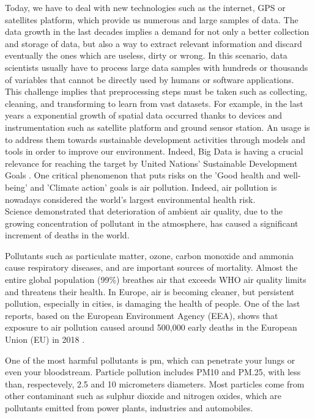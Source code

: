 Today, we have to deal with new technologies such as the internet, GPS or satellites platform, which provide us numerous and large samples of data. The data growth in the last decades implies a demand for not only a better collection and storage of data, but also a way to extract relevant information and discard eventually the ones which are useless, dirty or wrong.
In this scenario, data scientists usually have to process large data samples with hundreds or thousands of variables that \cite{garcia2016big} cannot be directly used by humans or software applications.
This challenge implies that preprocessing steps must be taken such as collecting, cleaning, and transforming to learn from vast datasets.
For example, in the last years a exponential growth of spatial data occurred thanks to devices and instrumentation such as satellite platform and ground sensor station. 
An usage is to address them towards sustainable development activities through models and tools in order to improve our environment. Indeed, Big Data is having a crucial relevance for reaching the target by United Nations’ Sustainable Development Goals \cite{zhang2019orchestrating}.
One critical phenomenon that puts risks on the 'Good health and well-being' and 'Climate action' goals is air pollution.
Indeed, air pollution is nowadays considered the world's largest environmental health risk.\\
Science demonstrated that deterioration of ambient air quality, due to the growing concentration of pollutant in the atmosphere, has caused a significant increment of deaths in the world.\par  
Pollutants such as particulate matter, ozone, carbon monoxide and ammonia cause respiratory diseases, and are important sources of mortality.
Almost the entire global population (99\%) breathes air that exceeds WHO air quality limits and threatens their health.\newline
In Europe, air is becoming cleaner, but persistent pollution, especially in cities, is damaging the health of people. One of the last reports, based on the European Environment Agency (EEA), shows that exposure to air pollution caused around 500,000 early deaths in the European Union (EU) in 2018 \cite{european2018air}.\par
One of the most harmful pollutants is \gls{pm}, which can penetrate your lungs or even your bloodstream.\newline 
Particle pollution includes PM10 and PM.25, with less than, respectevely, 2.5 and 10 micrometers diameters.
Most particles come from other contaminant such as sulphur dioxide and nitrogen oxides, which are pollutants emitted from power plants, industries and automobiles.\par
